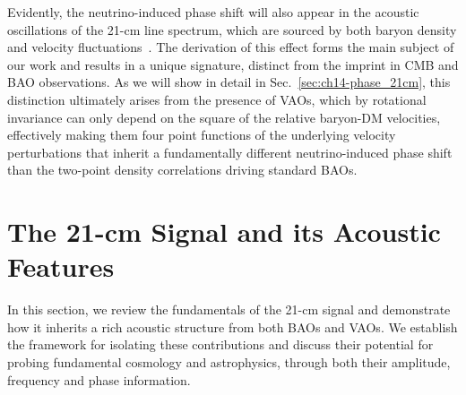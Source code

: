 Evidently, the neutrino-induced phase shift will also appear in the acoustic oscillations of the 21-cm line spectrum, which are sourced by both baryon density and velocity fluctuations~\citep*[see also \citep{barkana06, mao12}]{munoz19, munoz19b, Cruz:2024fsv}. The derivation of this effect forms the main subject of our work and results in a unique signature, distinct from the imprint in CMB and BAO observations. As we will show in detail in Sec.~\ref{sec:ch14-phase_21cm}, this distinction ultimately arises from the presence of VAOs, which by rotational invariance can only depend on the square of the relative baryon-DM velocities, effectively making them four point functions of the underlying velocity perturbations that inherit a fundamentally different neutrino-induced phase shift than the two-point density correlations driving standard BAOs.

\section{The 21-cm Signal and its Acoustic Features}\label{sec:ch14-3}

In this section, we review the fundamentals of the 21-cm signal and demonstrate how it inherits a rich acoustic structure from both BAOs and VAOs. We establish the framework for isolating these contributions and discuss their potential for probing fundamental cosmology and astrophysics, through both their amplitude, frequency and phase information.
